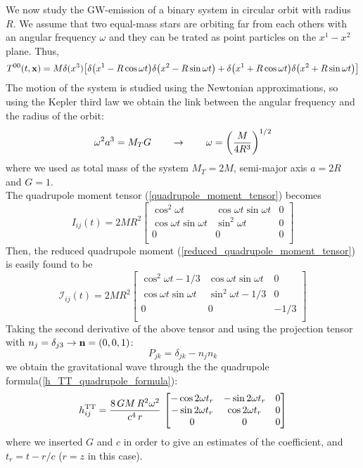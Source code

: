 We now study the GW-emission of a binary system in circular orbit with radius $R$.
We assume that two equal-mass stars are orbiting far from each others with an angular frequency $\omega$ and they can be trated as point particles on the $x^{1}-x^{2}$ plane. Thus,
\[
T^{00} (t,\vb{x}) = M \delta(x^{3}) \qty[
\delta\qty(x^{1}-R\cos \omega t)
\delta\qty(x^{2}-R\sin \omega t)
+
\delta\qty(x^{1}+R\cos \omega t)
\delta\qty(x^{2}+R\sin \omega t)
]
\]
The motion of the system is studied using the Newtonian approximations, so using the  Kepler third law we obtain the link between the angular frequency and the radius of the orbit:
\[
\omega ^{2} 
a^{3} = M_T G 
\qquad
\rightarrow
\qquad 
\omega = \qty(\dfrac{M}{4R^{3}})^{1/2}
\]
where we used as total mass of the system $M_T = 2M$, semi-major axis $a=2R$ and $G=1$.\\
The quadrupole moment tensor (\ref{quadrupole_moment_tensor}) becomes
\[
I_{ij}(t) =
2 M R^{2}
\begin{bmatrix}
 \cos ^{2} \omega t  &
 \cos \omega t \sin \omega t &
0
\\
 \cos \omega t \sin \omega t &
 \sin ^{2} \omega t &
0
\\
0 & 0 & 0\\
\end{bmatrix} 
\]
Then, the reduced quadrupole moment (\ref{reduced_quadrupole_moment_tensor}) is easily found to be
\[
\mathcal{I} _{ij}(t) =
2 M R^{2}
\begin{bmatrix}
 \cos ^{2} \omega t -1/3  &
 \cos \omega t \sin \omega t &
0
\\
 \cos \omega t \sin \omega t &
 \sin ^{2} \omega t -1/3&
0
\\
0 & 0 & -1/3\\
\end{bmatrix} 
\]
Taking the second derivative of the above tensor and using the projection tensor with $n_{j} =\delta_{j3} \rightarrow \vb{n} = (0,0,1)$:
\[
P_{jk} = \delta_{jk}- n_{j} n_{k}
\]
we obtain the gravitational wave through the the quadrupole formula(\ref{h_TT_quadrupole_formula}):
\[
h^{\text{TT}} _{ij} = \dfrac{8\,G M \,R^{2} \omega^{2}}{c^{4}\, r} \,
\begin{bmatrix}
- \cos 2 \omega t_r   &
 - \sin 2 \omega t_r &
0
\\
  -\sin 2 \omega t_r &
 \cos 2 \omega t_r &
0
\\
0 & 0 & 0\\
\end{bmatrix}
\]
where we inserted $G$ and $c$ in order to give an estimates of the coefficient, and $t_r = t -r/c$ ($r=z$ in this case).\\
